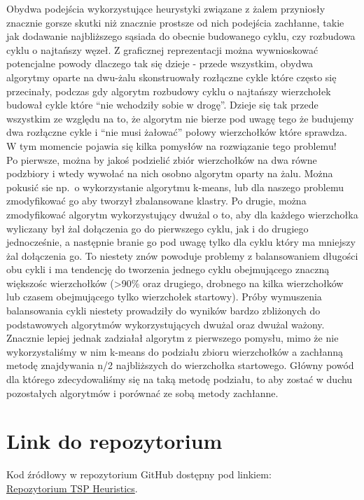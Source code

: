 \documentclass[11pt]{article}
\begin{document}
Obydwa podejścia wykorzystujące heurystyki związane z żalem przyniosły znacznie gorsze skutki niż znacznie prostsze od nich podejścia zachłanne,
takie jak dodawanie najbliższego sąsiada do obecnie budowanego cyklu, czy rozbudowa cyklu o najtańszy węzeł.
Z graficznej reprezentacji można wywnioskować potencjalne powody dlaczego tak się dzieje - przede wszystkim, obydwa algorytmy oparte na dwu-żalu skonstruowały rozłączne cykle które często się przecinały,
podczas gdy algorytm rozbudowy cyklu o najtańszy wierzchołek budował cykle które ``nie wchodziły sobie w drogę''.
Dzieje się tak przede wszystkim ze względu na to, że algorytm nie bierze pod uwagę tego że budujemy dwa rozłączne cykle i ``nie musi żałować'' połowy wierzchołków które sprawdza.
W tym momencie pojawia się kilka pomysłów na rozwiązanie tego problemu! \\
Po pierwsze, można by jakoś podzielić zbiór wierzchołków na dwa równe podzbiory i wtedy wywołać na nich osobno algorytm oparty na żalu.
Można pokusić sie np.\ o wykorzystanie algorytmu k-means, lub dla naszego problemu zmodyfikować go aby tworzył zbalansowane klastry.
Po drugie, można zmodyfikować algorytm wykorzystujący dwużal o to, aby dla każdego wierzchołka wyliczany był żal dołączenia go do pierwszego cyklu, jak i do drugiego jednocześnie,
a następnie branie go pod uwagę tylko dla cyklu który ma mniejszy żal dołączenia go.
To niestety znów powoduje problemy z balansowaniem długości obu cykli i ma tendencję do tworzenia jednego cyklu obejmującego znaczną większośc wierzchołków
(>90\% oraz drugiego, drobnego na kilka wierzchołków lub czasem obejmującego tylko wierzchołek startowy).
Próby wymuszenia balansowania cykli niestety prowadziły do wyników bardzo zbliżonych do podstawowych algorytmów wykorzystujących dwużal oraz dwużal ważony.
Znacznie lepiej jednak zadziałał algorytm z pierwszego pomysłu, mimo że nie wykorzystaliśmy w nim k-means do podziału zbioru wierzchołków a zachłanną metodę znajdywania n/2 najbliższych do wierzchołka startowego.
Główny powód dla którego zdecydowaliśmy się na taką metodę podziału, to aby zostać w duchu pozostałych algorytmów i porównać ze sobą metody zachłanne.

\section{Link do repozytorium}\label{sec:link-do-repo}
Kod źródłowy w repozytorium GitHub dostępny pod linkiem: \\
\href{https://github.com/KotZPolibudy/PUT_IMO/tree/main/TSP_heuristic}{Repozytorium TSP Heuristics}.
\end{document}
